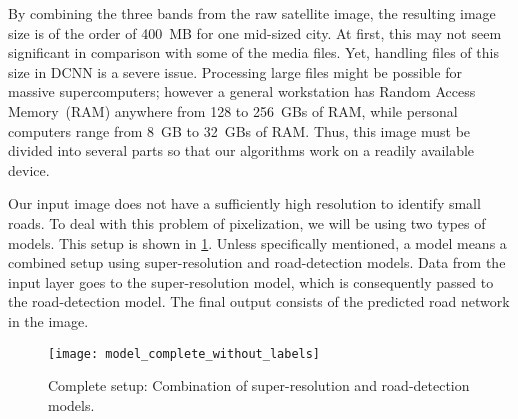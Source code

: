 By combining the three bands from the raw satellite image, the resulting image size is of the order of 400~MB for one mid-sized city. At first, this may not seem significant in comparison with some of the media files. Yet, handling files of this size in DCNN is a severe issue. Processing large files might be possible for massive supercomputers; however a general workstation has Random Access Memory~(RAM) anywhere from 128 to 256~GBs of RAM, while personal computers range from 8~GB to 32~GBs of RAM. Thus, this image must be divided into several parts so that our algorithms work on a readily available device.

Our input image does not have a sufficiently high resolution to identify small roads. To deal with this problem of pixelization, we will be using two types of models. This setup is shown in \cref{fig:model_complete_without_labels}. Unless specifically mentioned, a model means a combined setup using super-resolution and road-detection models. Data from the input layer goes to the super-resolution model, which is consequently passed to the road-detection model. The final output consists of the predicted road network in the image.

\begin{figure}[h!]
  \centering
  \texttt{[image: model\_complete\_without\_labels]}
  \caption{Complete setup: Combination of super-resolution and road-detection models.}
  \label{fig:model_complete_without_labels}
\end{figure}
